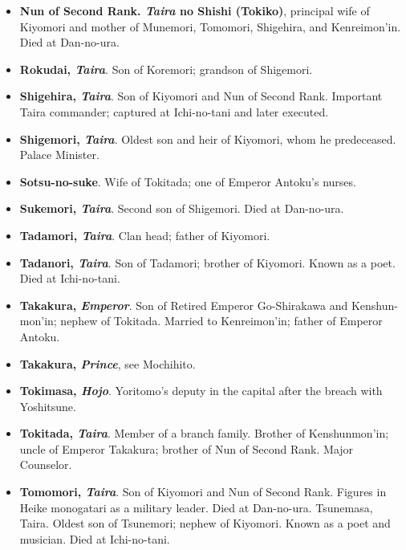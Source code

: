 \documentclass{article}
\begin{document}
\begin{small}
\begin{itemize}[
            label=,
            leftmargin=0em,
            itemindent=-2em,
            nosep,
        ]
        \item \textbf{Nun of Second Rank. \textit{Taira} no Shishi (Tokiko)}, principal wife of Kiyomori and mother of Munemori, Tomomori, Shigehira, and Kenreimon’in. Died at Dan-no-ura.

              \vspace{0.2cm} %

        \item \textbf{Rokudai, \textit{Taira}}. Son of Koremori; grandson of Shigemori.

        \item \textbf{Shigehira, \textit{Taira}}. Son of Kiyomori and Nun of Second Rank. Important Taira commander; captured at Ichi-no-tani and later executed.

        \item \textbf{Shigemori, \textit{Taira}}. Oldest son and heir of Kiyomori, whom he predeceased. Palace Minister.

        \item \textbf{Sotsu-no-suke}. Wife of Tokitada; one of Emperor Antoku’s nurses.

        \item \textbf{Sukemori, \textit{Taira}}. Second son of Shigemori. Died at Dan-no-ura.

        \item \textbf{Tadamori, \textit{Taira}}. Clan head; father of Kiyomori.

        \item \textbf{Tadanori, \textit{Taira}}. Son of Tadamori; brother of Kiyomori. Known as a poet. Died at Ichi-no-tani.

        \item \textbf{Takakura, \textit{Emperor}}. Son of Retired Emperor Go-Shirakawa and Kenshun-mon’in; nephew of Tokitada. Married to Kenreimon’in; father of Emperor Antoku.

        \item \textbf{Takakura, \textit{Prince}}, see Mochihito.

        \item \textbf{Tokimasa, \textit{Hojo}}. Yoritomo’s deputy in the capital after the breach with Yoshitsune.

        \item \textbf{Tokitada, \textit{Taira}}. Member of a branch family. Brother of Kenshunmon’in; uncle of Emperor Takakura; brother of Nun of Second Rank. Major Counselor.

        \item \textbf{Tomomori, \textit{Taira}}. Son of Kiyomori and Nun of Second Rank. Figures in Heike monogatari as a military leader. Died at Dan-no-ura. Tsunemasa, Taira. Oldest son of Tsunemori; nephew of Kiyomori. Known as a poet and musician. Died at Ichi-no-tani.


\end{itemize}
\end{small}
\end{document}
